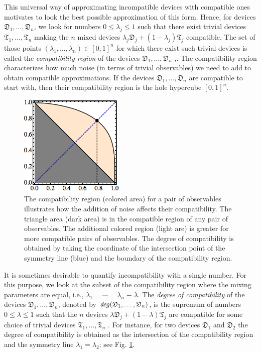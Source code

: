 \documentclass[12pt]{article}
\theoremstyle{definition}
\newcommand{\Dev}{\mathfrak{D}} %
\newcommand{\Triv}{\mathfrak{T}} %
\def\deg{\textit de\kern-.5pt g}
\begin{document}
This universal way of approximating incompatible devices with compatible ones motivates to look the best possible approximation of this form. 
Hence, for devices $\Dev_1,\ldots,\Dev_n$, we look for numbers $0\leq \lambda_j \leq 1$ such that there exist trivial devices $\Triv_1,\ldots,\Triv_n$ making the $n$ mixed devices 
$\lambda_j \Dev_j + (1-\lambda_j) \Triv_j$ compatible. 
The set of those points $(\lambda_1,\ldots,\lambda_n)\in [0,1]^n$ for which there exist such trivial devices is called the \emph{compatibility region} of the devices $\Dev_1,\ldots,\Dev_n$ \cite{BuHeScSt13},\cite{Gudder13}.
The compatibility region characterizes how much noise (in terms of trivial observables) we need to add to obtain compatible approximations.
If the devices $\Dev_1,\ldots,\Dev_n$ are compatible to start with, then their compatibility region is the hole hypercube $[0,1]^n$.

\begin{figure}\begin{center}
\includegraphics[width=5cm]{fig_region.png}
\caption{The compatibility region (colored area) for a pair of observables illustrates how the addition of noise affects their compatibility. The triangle area (dark area) is in the compatible region of any pair of observables. 
The additional colored region (light are) is greater for more compatible pairs of observables. 
The degree of compatibility is obtained by taking the coordinate of the intersection point of the symmetry line (blue) and the boundary of the compatibility region.}
\label{fig:degree}
\end{center}
\end{figure}

It is sometimes desirable to quantify incompatibility with a single number.
For this purpose, we look at the subset of the compatibility region where the mixing parameters are equal, i.e.,  $\lambda_1=\cdots =\lambda_n \equiv\lambda$.
The \emph{degree of compatibility} of the devices $\Dev_1,\ldots,\Dev_n$, denoted by $\deg(\Dev_1,\ldots,\Dev_n)$, is the supremum of numbers $0\leq \lambda \leq 1$ such that the $n$ devices 
$\lambda \Dev_j + (1-\lambda) \Triv_j$ are compatible for some choice of trivial devices $\Triv_1,\ldots,\Triv_n$ \cite{HeScToZi14}.
For instance, for two devices $\Dev_1$ and $\Dev_2$ the degree of compatibility is obtained as the intersection of the compatibility region and the symmetry line $\lambda_1=\lambda_2$; see Fig. \ref{fig:degree}. 
\end{document}
